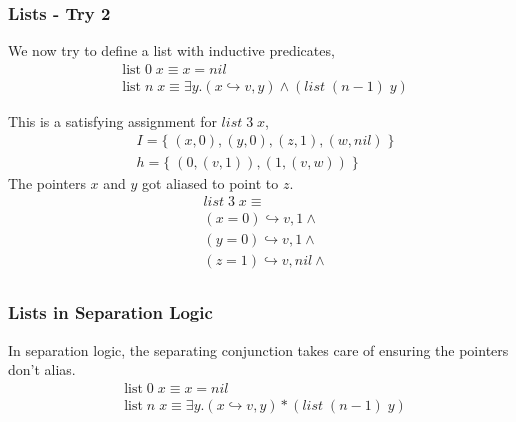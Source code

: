 \documentclass{beamer}
\begin{document}
\begin{frame}
\frametitle{Lists - Try 2}
We now try to define a list with inductive predicates,
\begin{align*}
    & \textrm{list} \; 0 \; x \equiv x = nil
    \\
    & \textrm{list} \; n \; x \equiv \exists y. (x \hookrightarrow v,y) \land (list \; (n-1) \; y)
\end{align*}

This is a satisfying assignment for $list \; 3 \; x$,
\begin{align*}
    & I = 
    \{\; (x,0), (y,0), (z,1) , (w,nil) \;\}
    \\
    & h = 
    \{\; (0, (v,1)) , (1, (v,w)) \;\}
\end{align*}
The pointers $x$ and $y$ got aliased to point to $z$.
\begin{align*}
    & list \; 3 \; x \equiv \\
    & (x = 0) \hookrightarrow v,1 \land \\
    & (y = 0) \hookrightarrow v,1 \land \\
    & (z = 1) \hookrightarrow v,nil \land \\
\end{align*}
\end{frame}

\begin{frame}
\frametitle{Lists in Separation Logic}
In separation logic, the separating conjunction takes care of ensuring
the pointers don't alias.
\begin{align*}
    & \textrm{list} \; 0 \; x \equiv x = nil
    \\
    & \textrm{list} \; n \; x \equiv \exists y. (x \hookrightarrow v,y) * (list \; (n-1) \; y)
\end{align*}
\end{frame}
\end{document}
